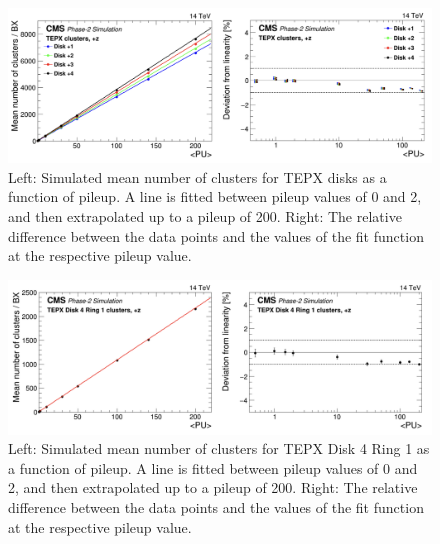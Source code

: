 

\begin{figure}[H]
  \centering
  \includegraphics[width=1\columnwidth]{ashish_thesis/michigan_2.png}
  \caption[TEPX cluster linear fit per disk]{\onehalfspacing Left: Simulated mean number of clusters for TEPX disks as a function of pileup. A line is fitted between pileup values of 0 and 2, and then extrapolated up to a pileup of 200. Right: %
    The relative difference between the data points and the values of the fit function at the respective pileup value. }
  \label{fig:CMS_4205}
\end{figure}


\begin{figure}[H]
  \centering
  \includegraphics[width=1\columnwidth]{ashish_thesis/michigan_3.png}
  \caption[TEPX clusters linear fit]{\onehalfspacing Left: Simulated mean number of clusters for  TEPX Disk 4 Ring 1 as a function of pileup. A line is fitted between pileup values of 0 and 2, and then extrapolated up to a pileup of 200. Right: %
    The relative difference between the data points and the values of the fit function at the respective pileup value. }
  \label{fig:CMS_4206}
\end{figure}



